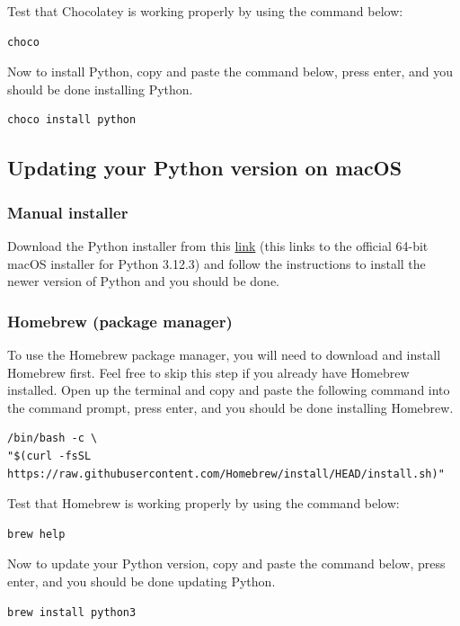 \documentclass[11pt]{article}
\begin{document}
Test that Chocolatey is working properly by using the command below:
\begin{verbatim}
choco
\end{verbatim}

Now to install Python, copy and paste the command below, press enter, and you should be done installing Python.
\begin{verbatim}
choco install python
\end{verbatim}

 \newpage

\subsection{Updating your Python version on macOS}
\label{sec:org909352e}

\subsubsection{Manual installer}
\label{sec:orge696172}
Download the Python installer from this \href{https://www.python.org/ftp/python/3.12.3/python-3.12.3-macos11.pkg}{link} (this links to the official 64-bit macOS installer for Python 3.12.3) and follow the instructions to install the newer version of Python and you should be done.

\subsubsection{Homebrew (package manager)}
\label{sec:org24ba114}
To use the Homebrew package manager, you will need to download and install Homebrew first. Feel free to skip this step if you already have Homebrew installed. Open up the terminal and copy and paste the following command into the command prompt, press enter, and you should be done installing Homebrew.
\begin{verbatim}
/bin/bash -c \
"$(curl -fsSL https://raw.githubusercontent.com/Homebrew/install/HEAD/install.sh)"
\end{verbatim}

Test that Homebrew is working properly by using the command below:
\begin{verbatim}
brew help
\end{verbatim}

Now to update your Python version, copy and paste the command below, press enter, and you should be done updating Python.
\begin{verbatim}
brew install python3
\end{verbatim}
\end{document}
